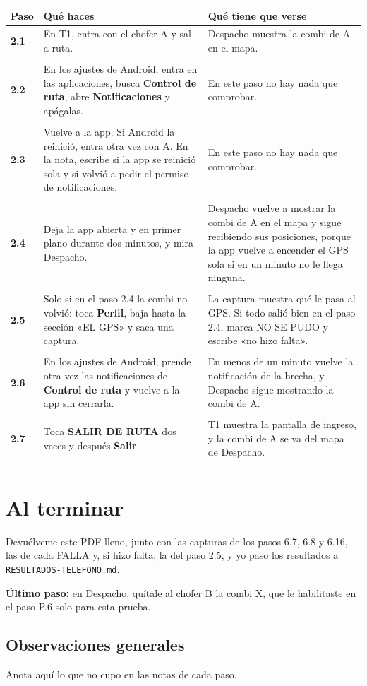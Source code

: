 \documentclass[10pt,a4paper]{article}
\makeatletter
\newcommand{\toca}[1]{\textcolor{azul}{\textbf{#1}}}
\newcommand{\nada}{\textcolor{tenue}{En este paso no hay nada que comprobar.}}
\newcommand{\caja}[2]{\hbox{\vrule height #1 depth 0pt width 0pt #2}}
\newcommand{\campo}[3]{%
  \raisebox{-0.35\height}{\caja{#3}{\TextField[name=#1, width=#2, height=#3, charsize=8pt, bordercolor={0.55 0.6 0.68},
    backgroundcolor={0.965 0.976 0.992}, multiline=true]{}}}}
\newcommand{\resultado}[1]{%
  \caja{9pt}{\ChoiceMenu[radio, name=resultado-#1, width=9pt, height=9pt, radiosymbol=l,
    bordercolor={0.35 0.38 0.45}, default=]{}{OK=ok,FALLA=falla,NO SE PUDO=nopudo}}}
\newcommand{\paso}[4]{%
  \textbf{#1} & #3 & #4 \\*
  \multicolumn{3}{@{\hspace{6pt}}l@{}}{\rule{0pt}{15pt}\small
    \resultado{#2}\hspace{0.4em}Hora:~\campo{hora-#2}{1.7cm}{13pt}\hspace{1.2em}Nota:~\campo{nota-#2}{8.3cm}{22pt}}\\[3pt]
  \hline
}
\newenvironment{pasos}{%
  \begin{longtable}{@{\hspace{6pt}}>{\raggedright\arraybackslash}p{0.9cm}>{\raggedright\arraybackslash}p{7.9cm}>{\raggedright\arraybackslash}p{7.3cm}@{}}
  \rowcolor{cabecera}\textbf{Paso} & \textbf{Qué haces} & \textbf{Qué tiene que verse} \\ \hline
  \endhead
}{\end{longtable}\vspace{-0.6em}}
\makeatother
\begin{document}
\begin{Form}
\begin{pasos}
\paso{2.1}{2-1}{En T1, entra con el chofer A y sal a ruta.}{Despacho muestra la combi de A en el mapa.}
\paso{2.2}{2-2}{En los ajustes de Android, entra en las aplicaciones, busca \toca{Control de ruta}, abre \toca{Notificaciones} y apágalas.}{\nada}
\paso{2.3}{2-3}{Vuelve a la app. Si Android la reinició, entra otra vez con A. En la nota, escribe si la app se reinició sola y si volvió a pedir el permiso de notificaciones.}{\nada}
\paso{2.4}{2-4}{Deja la app abierta y en primer plano durante dos minutos, y mira Despacho.}{Despacho vuelve a mostrar la combi de A en el mapa y sigue recibiendo sus posiciones, porque la app vuelve a encender el GPS sola si en un minuto no le llega ninguna.}
\paso{2.5}{2-5}{Solo si en el paso 2.4 la combi no volvió: toca \toca{Perfil}, baja hasta la sección «EL GPS» y saca una captura.}{La captura muestra qué le pasa al GPS. Si todo salió bien en el paso 2.4, marca NO SE PUDO y escribe «no hizo falta».}
\paso{2.6}{2-6}{En los ajustes de Android, prende otra vez las notificaciones de \toca{Control de ruta} y vuelve a la app sin cerrarla.}{En menos de un minuto vuelve la notificación de la brecha, y Despacho sigue mostrando la combi de A.}
\paso{2.7}{2-7}{Toca \toca{SALIR DE RUTA} dos veces y después \toca{Salir}.}{T1 muestra la pantalla de ingreso, y la combi de A se va del mapa de Despacho.}
\end{pasos}

\section{Al terminar}

Devuélveme este PDF lleno, junto con las capturas de los pasos 6.7, 6.8 y 6.16, las de cada FALLA y, si hizo falta, la del paso 2.5, y yo paso los resultados a \texttt{RESULTADOS-TELEFONO.md}.

\begin{nota}
\textbf{Último paso:} en Despacho, quítale al chofer B la combi X, que le habilitaste en el paso P.6 solo para esta prueba.
\end{nota}

\subsection{Observaciones generales}

Anota aquí lo que no cupo en las notas de cada paso.

\TextField[name=observaciones, width=\linewidth, height=6cm, charsize=9pt, multiline=true,
  bordercolor={0.55 0.6 0.68}, backgroundcolor={0.965 0.976 0.992}]{}

\end{Form}
\end{document}

